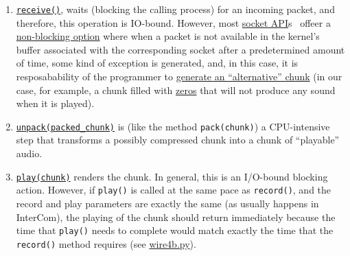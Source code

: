 \begin{enumerate}
\item \href{https://github.com/Tecnologias-multimedia/InterCom/blob/master/src/minimal.py#L109}{\texttt{receive()}},
  waits (blocking the calling process) for an incoming packet, and
  therefore, this operation is IO-bound. However, most
  \href{https://docs.python.org/3/library/socket.html}{socket
    API}s~\cite{python} offeer a
  \href{https://docs.python.org/3.8/library/socket.html#socket.socket.setblocking}{non-blocking
    option} where when a packet is not available in the kernel's
  buffer associated with the corresponding socket after a
  predetermined amount of time, some kind of exception is generated,
  and, in this case, it is resposabability of the programmer to
  \href{https://github.com/Tecnologias-multimedia/InterCom/blob/master/src/minimal.py#L104}{generate
    an ``alternative'' chunk} (in our case, for example, a chunk
  filled with
  \href{https://en.wikipedia.org/wiki/Digital_audio#Overview}{zeros}
  that will not produce any sound when it is played).

\item \href{https://github.com/Tecnologias-multimedia/InterCom/blob/master/src/minimal.py#L93}{\texttt{unpack(packed\_chunk)}} is (like the method
  \texttt{pack(chunk)}) a CPU-intensive step that transforms a
  possibly compressed chunk into a chunk of ``playable'' audio.

\item \href{https://github.com/Tecnologias-multimedia/InterCom/blob/master/src/minimal.py#L174}{\texttt{play(chunk)}} renders the chunk. In general, this is an
  I/O-bound blocking action. However, if \verb|play()| is called at
  the same pace as \verb|record()|, and the record and play parameters
  are exactly the same (as usually happens in InterCom), the playing of
  the chunk should return immediately because the time that
  \verb|play()| needs to complete would match exactly the time
  that the \verb|record()| method requires (see
  \href{https://github.com/Tecnologias-multimedia/InterCom/blob/master/test/sounddevice/wire4b.py}{wire4b.py}).
\end{enumerate}

